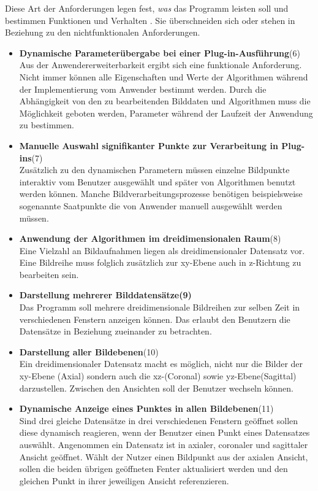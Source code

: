 Diese Art der Anforderungen legen fest, \textit{was} das Programm leisten soll und bestimmen Funktionen und Verhalten \cite[9]{balzert:swa}. Sie überschneiden sich oder stehen in Beziehung zu den nichtfunktionalen Anforderungen.

\begin{itemize}
\item \textbf{Dynamische Parameterübergabe bei einer Plug-in-Ausführung}(6)\\
		Aus der Anwendererweiterbarkeit ergibt sich eine funktionale Anforderung. Nicht immer können alle Eigenschaften und Werte der Algorithmen während der Implementierung vom Anwender bestimmt werden. Durch die Abhängigkeit von den zu bearbeitenden Bilddaten und Algorithmen muss die Möglichkeit geboten werden, Parameter während der Laufzeit der Anwendung zu bestimmen.

\item \textbf{Manuelle Auswahl signifikanter Punkte zur Verarbeitung in Plug-ins}(7)\\
		Zusätzlich zu den dynamischen Parametern müssen einzelne Bildpunkte interaktiv vom Benutzer ausgewählt und später von Algorithmen benutzt werden können. Manche Bildverarbeitungsprozesse benötigen beispielsweise sogenannte Saatpunkte die von Anwender manuell ausgewählt werden müssen.

\item \textbf{Anwendung der Algorithmen im dreidimensionalen Raum}(8)\\
	  Eine Vielzahl an Bildaufnahmen liegen als dreidimensionaler Datensatz vor. Eine Bildreihe muss folglich zusätzlich zur xy-Ebene auch in z-Richtung zu bearbeiten sein.

\item \textbf{Darstellung mehrerer Bilddatensätze(9)}\\
	Das Programm soll mehrere dreidimensionale Bildreihen zur selben Zeit in verschiedenen Fenstern anzeigen können. Das erlaubt den Benutzern die Datensätze in Beziehung zueinander zu betrachten.

\item \textbf{Darstellung aller Bildebenen}(10)\\
	  Ein dreidimensionaler Datensatz macht es möglich, nicht nur die Bilder der xy-Ebene (Axial) sondern auch die xz-(Coronal) sowie yz-Ebene(Sagittal) darzustellen. Zwischen den Ansichten soll der Benutzer wechseln können.

\item \textbf{Dynamische Anzeige eines Punktes in allen Bildebenen}(11)\\
	  Sind drei gleiche Datensätze in drei verschiedenen Fenstern geöffnet sollen diese dynamisch reagieren, wenn der Benutzer einen Punkt eines Datensatzes auswählt. Angenommen ein Datensatz ist in axialer, coronaler und sagittaler Ansicht geöffnet. Wählt der Nutzer einen Bildpunkt aus der axialen Ansicht, sollen die beiden übrigen geöffneten Fenter aktualisiert werden und den gleichen Punkt in ihrer jeweiligen Ansicht referenzieren.
	  

\end{itemize}
